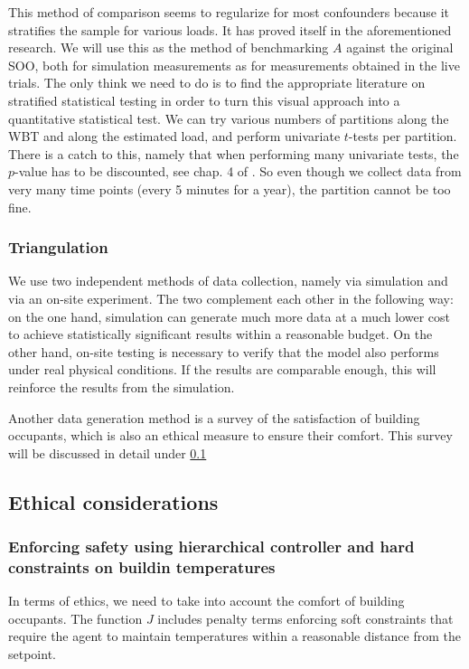 \documentclass{article}
\theoremstyle{definition}
\theoremstyle{remark}
\begin{document}
This method of comparison seems to regularize for most confounders because it stratifies the sample for various loads. It has proved itself in the aforementioned research. We will use this as the method of benchmarking $A$ against the original SOO, both for simulation measurements as for measurements obtained in the live trials. The only think we need to do is to find the appropriate literature on stratified statistical testing in order to turn this visual approach into a quantitative statistical test. We can try various numbers of partitions along the WBT and along the estimated load, and perform univariate $t$-tests per partition. There is a catch to this, namely that when performing many univariate tests, the $p$-value has to be discounted, see chap. 4 of \cite{091a7cc2b3e34c708e1bedf1387c10c1}. So even though we collect data from very many time points (every 5 minutes for a year), the partition cannot be too fine.

\subsubsection{Triangulation}
We use two independent methods of data collection, namely via simulation and via an on-site experiment. The two complement each other in the following way: on the one hand, simulation can generate much more data at a much lower cost to achieve statistically significant results within a reasonable budget. On the other hand, on-site testing is necessary to verify that the model also performs under real physical conditions. If the results are comparable enough, this will reinforce the results from the simulation.

Another data generation method is a survey of the satisfaction of building occupants, which is also an ethical measure to ensure their comfort. This survey will be discussed in detail under \ref{Ethical considerations}

\subsection{Ethical considerations} \label{Ethical considerations}
\subsubsection{Enforcing safety using hierarchical controller and hard constraints on buildin temperatures}
In terms of ethics, we need to take into account the comfort of building occupants. The function $J$ includes penalty terms enforcing soft constraints that require the agent to maintain temperatures within a reasonable distance from the setpoint.
\end{document}
